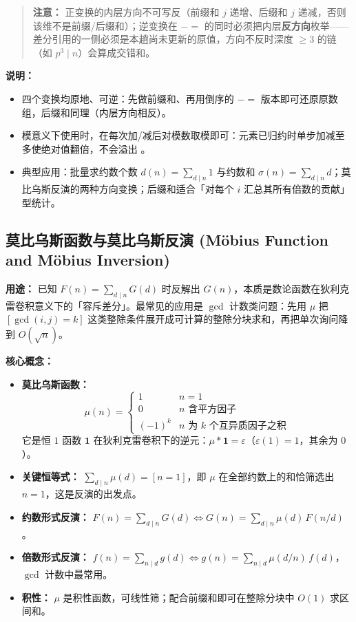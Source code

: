 \begin{quote}
\textbf{注意：} 正变换的内层方向不可写反（前缀和 $j$ 递增、后缀和 $j$ 递减，否则该维不是前缀/后缀和）；逆变换在 $-=$ 的同时必须把内层\textbf{反方向}枚举——差分引用的一侧必须是本趟尚未更新的原值，方向不反时深度 $\ge 3$ 的链（如 $p^3\mid n$）会算成交错和。
\end{quote}

\textbf{说明：}
\begin{itemize}
    \item 四个变换均原地、可逆：先做前缀和、再用倒序的 $-=$ 版本即可还原原数组，后缀和同理（内层方向相反）。
    \item 模意义下使用时，在每次加/减后对模数取模即可：元素已归约时单步加减至多使绝对值翻倍，不会溢出 。
    \item 典型应用：批量求约数个数 $d(n)=\sum_{d\mid n}1$ 与约数和 $\sigma(n)=\sum_{d\mid n}d$；莫比乌斯反演的两种方向变换；后缀和适合「对每个 $i$ 汇总其所有倍数的贡献」型统计。
\end{itemize}

\subsection{莫比乌斯函数与莫比乌斯反演 (Möbius Function and Möbius Inversion)}

\textbf{用途：}
已知 $F(n)=\sum_{d\mid n}G(d)$ 时反解出 $G(n)$，本质是数论函数在狄利克雷卷积意义下的「容斥差分」。最常见的应用是 $\gcd$ 计数类问题：先用 $\mu$ 把 $[\gcd(i,j)=k]$ 这类整除条件展开成可计算的整除分块求和，再把单次询问降到 $O(\sqrt{n})$。

\textbf{核心概念：}
\begin{itemize}
    \item \textbf{莫比乌斯函数：}
    \[ \mu(n)=\begin{cases}1 & n=1\\ 0 & n\text{ 含平方因子}\\ (-1)^k & n\text{ 为 }k\text{ 个互异质因子之积}\end{cases} \]
    它是恒 $1$ 函数 $\mathbf{1}$ 在狄利克雷卷积下的逆元：$\mu * \mathbf{1} = \varepsilon$（$\varepsilon(1)=1$，其余为 $0$）。
    \item \textbf{关键恒等式：} $\sum_{d\mid n}\mu(d) = [n=1]$，即 $\mu$ 在全部约数上的和恰筛选出 $n=1$，这是反演的出发点。
    \item \textbf{约数形式反演：} $F(n)=\sum_{d\mid n}G(d)\iff G(n)=\sum_{d\mid n}\mu(d)\,F(n/d)$。
    \item \textbf{倍数形式反演：} $f(n)=\sum_{n\mid d}g(d)\iff g(n)=\sum_{n\mid d}\mu(d/n)\,f(d)$，$\gcd$ 计数中最常用。
    \item \textbf{积性：} $\mu$ 是积性函数，可线性筛；配合前缀和即可在整除分块中 $O(1)$ 求区间和。
\end{itemize}

